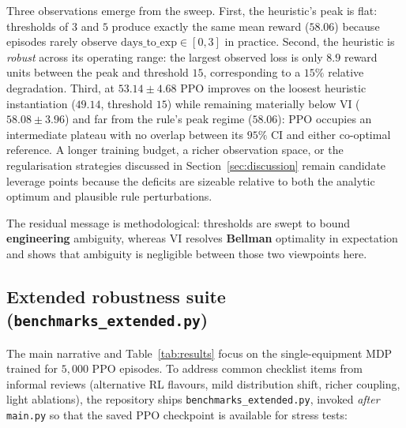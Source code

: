Three observations emerge from the sweep. First, the heuristic's peak
is flat: thresholds of $3$ and $5$ produce exactly the same mean
reward ($58.06$) because episodes rarely observe $\mathrm{days\_to\_exp}
\in [0, 3]$ in practice. Second, the heuristic is \emph{robust} across
its operating range: the largest observed loss is only $8.9$ reward
units between the peak and threshold $15$, corresponding to a $15\%$
relative degradation. Third, at $53.14 \pm 4.68$ PPO improves on the loosest heuristic
instantiation ($49.14$, threshold $15$) while remaining materially below VI
($58.08 \pm 3.96$) and far from the rule's peak regime ($58.06$): PPO occupies an
intermediate plateau with no overlap between its $95\%$ CI and either
co-optimal reference.
A longer training budget, a richer observation space, or the
regularisation strategies discussed in Section~\ref{sec:discussion}
remain candidate leverage points because the deficits are sizeable
relative to both the analytic optimum and plausible rule perturbations.

The residual message is methodological: thresholds are swept to bound
\textbf{engineering} ambiguity, whereas VI resolves \textbf{Bellman}
optimality in expectation and shows that ambiguity is negligible between
those two viewpoints here.


\subsection{Extended robustness suite (\texttt{benchmarks\_extended.py})}
\label{subsec:further-exp}

The main narrative and Table~\ref{tab:results} focus on the single-equipment
MDP trained for $5{,}000$ PPO episodes. To address common checklist items from
informal reviews (alternative RL flavours, mild distribution shift, richer
coupling, light ablations), the repository ships
\texttt{benchmarks\_extended.py}, invoked \emph{after} \texttt{main.py} so that
the saved PPO checkpoint is available for stress tests:

